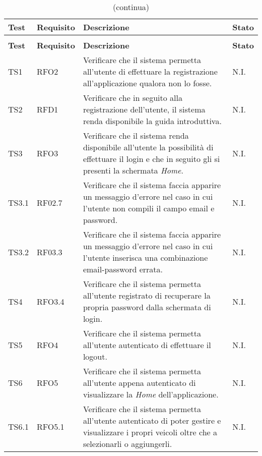 	\begin{longtable}{ >{\centering}p{} >{\centering}p{} >{\centering}p{}
			 >{\centering}p{}} %
			
		\caption{Riepilogo test di sistema}\\	
		\rowcolorhead
		\textbf{\color{white}Test} 
		& \textbf{\color{white}Requisito} 
		& \textbf{\color{white}Descrizione} 
	& \textbf{\color{white}Stato} 
		\tabularnewline %
		\endfirsthead	
		
		\rowcolor{white}\caption[]{(continua)}\\	
		\rowcolorhead
		\textbf{\color{white}Test} 
		& \textbf{\color{white}Requisito} 
		& \textbf{\color{white}Descrizione} 
			& \textbf{\color{white}Stato} 
		\tabularnewline %
		\endhead	
		
		TS1	& RFO2 & Verificare che il sistema permetta all'utente di effettuare la registrazione all'applicazione qualora non lo fosse. & N.I.	\tabularnewline
		
		 TS2	& RFD1 & Verificare che in seguito alla registrazione dell'utente, il sistema renda disponibile la guida introduttiva.		& N.I.	\tabularnewline
		 
		 TS3	& RFO3 & Verificare che il sistema renda disponibile all'utente la possibilità di effettuare il login e che in seguito gli si presenti la schermata \textit{Home}.	& N.I.	\tabularnewline
		 
		 TS3.1 & RF02.7 & Verificare che il sistema faccia apparire un messaggio d'errore nel caso in cui l'utente non compili il campo email e password.	& N.I.	\tabularnewline
		 
		 TS3.2 & RF03.3 &	Verificare che il sistema faccia apparire un messaggio d'errore nel caso in cui l'utente inserisca una combinazione email-password errata. & N.I.		\tabularnewline
		 
		 TS4 & RFO3.4	& Verificare che il sistema permetta all'utente registrato di recuperare la propria password dalla schermata di login.		& N.I.	\tabularnewline
		 
		 TS5	& RFO4 & Verificare che il sistema permetta all'utente autenticato di effettuare il logout.& N.I.	 \tabularnewline
		 
		 TS6	& RFO5 & Verificare che il sistema permetta all'utente appena autenticato di visualizzare la \textit{Home} dell'applicazione. & N.I.		\tabularnewline
		 
		 TS6.1	& RFO5.1 & Verificare che il sistema permetta all'utente autenticato di poter gestire e visualizzare i propri veicoli oltre che a selezionarli o aggiungerli. 	& N.I.		\tabularnewline 
		 

\end{longtable}
